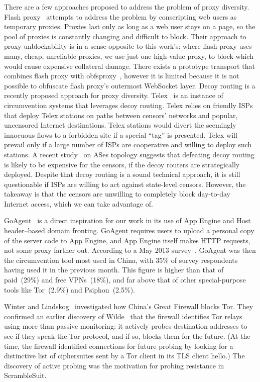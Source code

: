 \documentclass{article}
\begin{document}
There are a few approaches proposed to address the problem of proxy diversity.
Flash proxy~\cite{flashproxy-pets12} attempts to address the problem  by
conscripting web users as temporary proxies. Proxies last only as long as a web
user stays on a page, so the pool of proxies is constantly changing and
difficult to block. Their approach to proxy unblockability is in a sense
opposite to this work's: where flash proxy uses many, cheap, unreliable proxies,
we use just one high-value proxy, to block which would cause expensive
collateral damage. There exists a prototype transport that combines flash proxy
with obfsproxy~\cite{obfs-flash}, however it is limited because it is not
possible to obfuscate flash proxy's outermost WebSocket layer. Decoy routing is
a recently proposed approach for proxy diversity. Telex~\cite{telex} is an
instance of circumvention systems that leverages decoy routing. Telex relies on
friendly ISPs that deploy Telex stations on paths between censors' networks and
popular, uncensored Internet destinations. Telex stations would divert the
seemingly  innocuous flows to a forbidden site if a special ``tag'' is
presented. Telex will prevail only if a large number of ISPs are cooperative and
willing to deploy such stations. A recent study~\cite{nodirectionhome} on ASes
topology suggests that defeating decoy routing is likely to be expensive for the
censors, if the decoy routers are strategically deployed. Despite that decoy
routing is a sound technical approach, it is still questionable if ISPs are
willing to act against state-level censors. However, the takeaway is that the
censors are unwilling to completely block day-to-day Internet access, which we
can take advantage of.

GoAgent~\cite{goagent} is a direct inspiration for our work in its use of App
Engine and Host header--based domain fronting. GoAgent requires users to upload
a personal copy of the server code to App Engine, and App Engine itself makes
HTTP requests, not some proxy farther out. According to a May 2013 survey~\cite
{collateral-freedom},  GoAgent was then the circumvention tool most used in
China, with 35\% of survey respondents having used it in the previous month.
This figure is higher than that of paid~(29\%) and free VPNs~(18\%), and far
above that of other special-purpose tools like Tor~(2.9\%) and Psiphon~(2.5\%).

Winter and Lindskog~\cite{foci12-winter} investigated how China's Great Firewall blocks Tor.
They confirmed an earlier discovery of Wilde~\cite{wilde} that the firewall identifies Tor relays using more than passive monitoring:
it actively probes destination addresses to see if they speak the Tor protocol, and if so,
blocks them for the future.
(At the time, the firewall identified connections for future probing by looking for a distinctive
list of ciphersuites sent by a Tor client in its TLS client hello.) %
The discovery of active probing was the motivation for probing resistance in ScrambleSuit.


  

\end{document}
